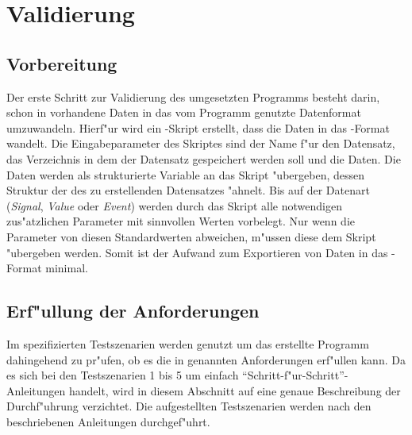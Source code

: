 \chapter{Validierung}
\label{chap:validierung}

\section{Vorbereitung}

Der erste Schritt zur Validierung des umgesetzten Programms besteht darin, schon in \ml vorhandene Daten in das vom Programm genutzte Datenformat umzuwandeln.
Hierf"ur wird ein \mlNS-Skript erstellt, dass die Daten in das \usNS-Format wandelt.
Die Eingabeparameter des Skriptes sind der Name f"ur den Datensatz, das Verzeichnis in dem der Datensatz gespeichert werden soll und die Daten.
Die Daten werden als strukturierte Variable an das Skript "ubergeben, dessen Struktur der des zu erstellenden Datensatzes "ahnelt.
Bis auf der Datenart (\emph{Signal}, \emph{Value} oder \emph{Event}) werden durch das Skript alle notwendigen zus"atzlichen Parameter mit sinnvollen Werten vorbelegt.
Nur wenn die Parameter von diesen Standardwerten abweichen, m"ussen diese dem Skript "ubergeben werden.
Somit ist der Aufwand zum Exportieren von Daten in das \usNS-Format minimal.


\section{Erf"ullung der Anforderungen}
\label{sec:anforderungsvalidierung}

Im  spezifizierten Testszenarien werden genutzt um das erstellte Programm dahingehend zu pr"ufen, ob es die in  genannten Anforderungen erf"ullen kann.
Da es sich bei den Testszenarien 1 bis 5 um einfach "`Schritt-f"ur-Schritt"'-Anleitungen handelt, wird in diesem Abschnitt auf eine genaue Beschreibung der Durchf"uhrung verzichtet.
Die aufgestellten Testszenarien werden nach den beschriebenen Anleitungen durchgef"uhrt.

